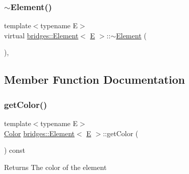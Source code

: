 \mbox{\label{classbridges_1_1_element_a1dcdcd8948db683fc109687fe5d9c8e1}} 
\subsubsection{\texorpdfstring{$\sim$Element()}{~Element()}}
{\footnotesize\ttfamily template$<$typename E$>$ \\
virtual \mbox{\hyperlink{classbridges_1_1_element}{bridges\+::\+Element}}$<$ \mbox{\hyperlink{namespacebridges_acfb0a4f7877d8f63de3e6862004c50eda3a3ea00cfc35332cedf6e5e9a32e94da}{E}} $>$\+::$\sim$\mbox{\hyperlink{classbridges_1_1_element}{Element}} (\begin{DoxyParamCaption}{ }\end{DoxyParamCaption})\hspace{0.3cm}{\ttfamily [inline]}, {\ttfamily [virtual]}}



\subsection{Member Function Documentation}
\mbox{\label{classbridges_1_1_element_ad6725703e86f04f169bc63f4e3a714d0}} 
\subsubsection{\texorpdfstring{getColor()}{getColor()}}
{\footnotesize\ttfamily template$<$typename E$>$ \\
\mbox{\hyperlink{classbridges_1_1_color}{Color}} \mbox{\hyperlink{classbridges_1_1_element}{bridges\+::\+Element}}$<$ \mbox{\hyperlink{namespacebridges_acfb0a4f7877d8f63de3e6862004c50eda3a3ea00cfc35332cedf6e5e9a32e94da}{E}} $>$\+::get\+Color (\begin{DoxyParamCaption}{ }\end{DoxyParamCaption}) const\hspace{0.3cm}{\ttfamily [inline]}}

\begin{DoxyReturn}{Returns}
The color of the element 
\end{DoxyReturn}
\mbox{\label{classbridges_1_1_element_a513b3409e4b689a390b0dcd50cc2d643}} 
